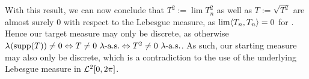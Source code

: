 With this result, we can now conclude that $T^2 := \lim T_n^2$ as well as $T := \sqrt{T^2}$ are almost surely $0$ with respect to the Lebesgue measure, as $\lim \langle T_n, T_n \rangle = 0$ for \Ninf. Hence our target measure may only be discrete, as otherwise $\lambda^{}(\text{supp}(T)) \neq 0 \Leftrightarrow T \neq 0~\lambda\text{-a.s.} \Leftrightarrow T^2 \neq 0~\lambda\text{-a.s.}$. As such, our starting measure may also only be discrete, which is a contradiction to the use of the underlying Lebesgue measure in $\mathcal{L}^{2}[0, 2\pi]$.








